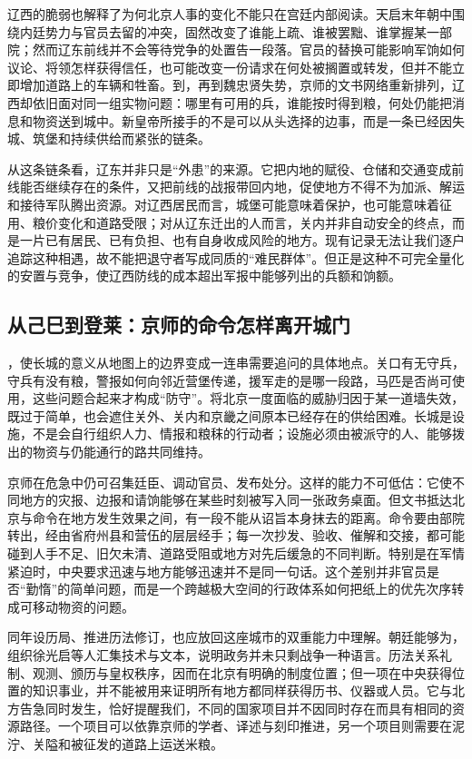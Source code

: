辽西的脆弱也解释了为何北京人事的变化不能只在宫廷内部阅读。天启末年朝中围绕内廷势力与官员去留的冲突，固然改变了谁能上疏、谁被罢黜、谁掌握某一部院；然而辽东前线并不会等待党争的处置告一段落。官员的替换可能影响军饷如何议论、将领怎样获得信任，也可能改变一份请求在何处被搁置或转发，但并不能立即增加道路上的车辆和牲畜。到，再到魏忠贤失势，京师的文书网络重新排列，辽西却依旧面对同一组实物问题：哪里有可用的兵，谁能按时得到粮，何处仍能把消息和物资送到城中。新皇帝所接手的不是可以从头选择的边事，而是一条已经因失城、筑堡和持续供给而紧张的链条。

从这条链条看，辽东并非只是“外患”的来源。它把内地的赋役、仓储和交通变成前线能否继续存在的条件，又把前线的战报带回内地，促使地方不得不为加派、解运和接待军队腾出资源。对辽西居民而言，城堡可能意味着保护，也可能意味着征用、粮价变化和道路受限；对从辽东迁出的人而言，关内并非自动安全的终点，而是一片已有居民、已有负担、也有自身收成风险的地方。现有记录无法让我们逐户追踪这种相遇，故不能把退守者写成同质的“难民群体”。但正是这种不可完全量化的安置与竞争，使辽西防线的成本超出军报中能够列出的兵额和饷额。

\subsection{从己巳到登莱：京师的命令怎样离开城门}

，使长城的意义从地图上的边界变成一连串需要追问的具体地点。关口有无守兵，守兵有没有粮，警报如何向邻近营堡传递，援军走的是哪一段路，马匹是否尚可使用，这些问题合起来才构成“防守”。将北京一度面临的威胁归因于某一道墙失效，既过于简单，也会遮住关外、关内和京畿之间原本已经存在的供给困难。长城是设施，不是会自行组织人力、情报和粮秣的行动者；设施必须由被派守的人、能够拨出的物资与仍能通行的路共同维持。

京师在危急中仍可召集廷臣、调动官员、发布处分。这样的能力不可低估：它使不同地方的灾报、边报和请饷能够在某些时刻被写入同一张政务桌面。但文书抵达北京与命令在地方发生效果之间，有一段不能从诏旨本身抹去的距离。命令要由部院转出，经由省府州县和营伍的层层经手；每一次抄发、验收、催解和交接，都可能碰到人手不足、旧欠未清、道路受阻或地方对先后缓急的不同判断。特别是在军情紧迫时，中央要求迅速与地方能够迅速并不是同一句话。这个差别并非官员是否“勤惰”的简单问题，而是一个跨越极大空间的行政体系如何把纸上的优先次序转成可移动物资的问题。

同年设历局、推进历法修订，也应放回这座城市的双重能力中理解。朝廷能够为，组织徐光启等人汇集技术与文本，说明政务并未只剩战争一种语言。历法关系礼制、观测、颁历与皇权秩序，因而在北京有明确的制度位置；但一项在中央获得位置的知识事业，并不能被用来证明所有地方都同样获得历书、仪器或人员。它与北方告急同时发生，恰好提醒我们，不同的国家项目并不因同时存在而具有相同的资源路径。一个项目可以依靠京师的学者、译述与刻印推进，另一个项目则需要在泥泞、关隘和被征发的道路上运送米粮。

